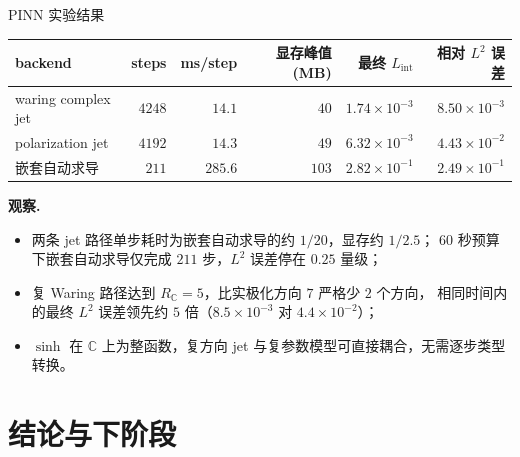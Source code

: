\documentclass[10pt,aspectratio=169]{beamer}
\newcommand{\C}{\mathbb{C}}
\begin{document}
\begin{frame}{PINN 实验结果}
  \footnotesize
  \begin{tabular}{lrrrrr}
    \toprule
    \textbf{backend} & \textbf{steps} & \textbf{ms/step} & \textbf{显存峰值 (MB)} & \textbf{最终 $L_{\mathrm{int}}$} & \textbf{相对 $L^2$ 误差} \\
    \midrule
    waring complex jet  & $4248$ & \alert{$14.1$} & \alert{$40$}  & \alert{$1.74\!\times\!10^{-3}$} & \alert{$8.50\!\times\!10^{-3}$} \\
    polarization jet    & $4192$ & $14.3$         & $49$          & $6.32\!\times\!10^{-3}$ & $4.43\!\times\!10^{-2}$ \\
    嵌套自动求导        & $211$  & $285.6$        & $103$         & $2.82\!\times\!10^{-1}$ & $2.49\!\times\!10^{-1}$ \\
    \bottomrule
  \end{tabular}

  \medskip
  \textbf{观察.}
  \begin{itemize}\setlength\itemsep{1pt}
    \item 两条 jet 路径单步耗时为嵌套自动求导的约 $1/20$，显存约 $1/2.5$；
        $60$ 秒预算下嵌套自动求导仅完成 $211$ 步，$L^2$ 误差停在 $0.25$ 量级；
    \item 复 Waring 路径达到 $R_\C=5$，比实极化方向 $7$ 严格少 $2$ 个方向，
        相同时间内的最终 $L^2$ 误差领先约 $5$ 倍（$8.5\!\times\!10^{-3}$ 对 $4.4\!\times\!10^{-2}$）；
    \item $\sinh$ 在 $\C$ 上为整函数，复方向 jet 与复参数模型可直接耦合，无需逐步类型转换。
  \end{itemize}
\end{frame}

\section{结论与下阶段}
\end{document}
